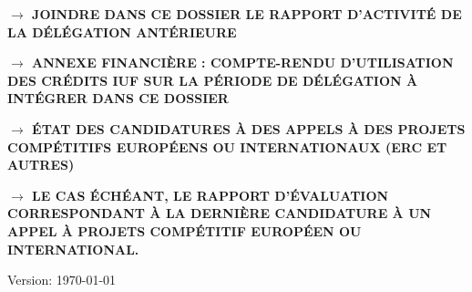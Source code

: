 \documentclass[a4paper,11pt]{article}
\newcommand{\anglaisFrancais}[2]{#2}
\newcommand{\anglaisFrancais}[2]{#1}
\begin{document}
\noindent{}\textbf{$\rightarrow$ \MakeUppercase{\anglaisFrancais{INCLUDE IN THIS FILE THE ACTIVITY REPORT OF THE PREVIOUS DELEGATION}{JOINDRE DANS CE DOSSIER LE RAPPORT D’ACTIVITÉ DE LA DÉLÉGATION ANTÉRIEURE}}}


\bigskip

\noindent{}\textbf{$\rightarrow$ \MakeUppercase{\anglaisFrancais{FINANCIAL ANNEX: SUMMARY OF THE USE OF IUF FUNDS OVER THE DELEGATION PERIOD, TO BE INCLUDED IN THIS FILE}{ANNEXE FINANCIÈRE : COMPTE-RENDU D’UTILISATION DES CRÉDITS IUF SUR LA PÉRIODE DE DÉLÉGATION À INTÉGRER DANS CE DOSSIER}}}

\bigskip

\noindent{}\textbf{$\rightarrow$ \MakeUppercase{\anglaisFrancais{LISTING OF APPLICATIONS TO EUROPEAN OR INTERNATIONAL COMPETITIVE CALLS FOR PROJECTS (EUROPEAN RESEARCH COUNCIL AND OTHERS)}{ÉTAT DES CANDIDATURES À DES APPELS À DES PROJETS COMPÉTITIFS EUROPÉENS OU INTERNATIONAUX (ERC ET AUTRES)}}}

\bigskip

\noindent{}\textbf{$\rightarrow$ \MakeUppercase{\anglaisFrancais{IF SUITABLE, THE EVALUATION REPORT CORRESPONDING TO THE LAST APPLICATION FOR A EUROPEAN OR INTERNATIONAL COMPETITIVE CALL FOR PROJECTS}{LE CAS ÉCHÉANT, LE RAPPORT D’ÉVALUATION CORRESPONDANT À LA DERNIÈRE CANDIDATURE À UN APPEL À PROJETS COMPÉTITIF EUROPÉEN OU INTERNATIONAL.}}}









\vspace{3cm}
{\tiny \hfill{}\textcolor{black!20}{Version: \today{}}}
\end{document}
